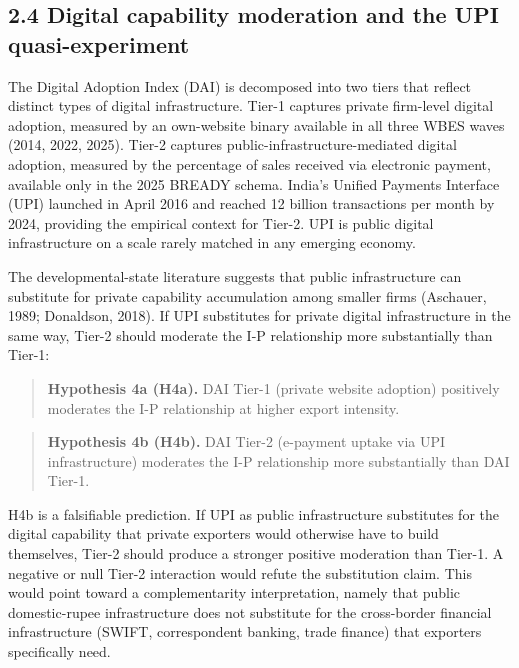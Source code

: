 \documentclass[
  12pt]{article}
\begin{document}
\hypertarget{digital-capability-moderation-and-the-upi-quasi-experiment}{%
\subsection{2.4 Digital capability moderation and the UPI
quasi-experiment}\label{digital-capability-moderation-and-the-upi-quasi-experiment}}

The Digital Adoption Index (DAI) is decomposed into two tiers that
reflect distinct types of digital infrastructure. Tier-1 captures
private firm-level digital adoption, measured by an own-website binary
available in all three WBES waves (2014, 2022, 2025). Tier-2 captures
public-infrastructure-mediated digital adoption, measured by the
percentage of sales received via electronic payment, available only in
the 2025 BREADY schema. India's Unified Payments Interface (UPI)
launched in April 2016 and reached 12 billion transactions per month by
2024, providing the empirical context for Tier-2. UPI is public digital
infrastructure on a scale rarely matched in any emerging economy.

The developmental-state literature suggests that public infrastructure
can substitute for private capability accumulation among smaller firms
(Aschauer, 1989; Donaldson, 2018). If UPI substitutes for private
digital infrastructure in the same way, Tier-2 should moderate the I-P
relationship more substantially than Tier-1:

\begin{quote}
\textbf{Hypothesis 4a (H4a).} DAI Tier-1 (private website adoption)
positively moderates the I-P relationship at higher export intensity.
\end{quote}

\begin{quote}
\textbf{Hypothesis 4b (H4b).} DAI Tier-2 (e-payment uptake via UPI
infrastructure) moderates the I-P relationship more substantially than
DAI Tier-1.
\end{quote}

H4b is a falsifiable prediction. If UPI as public infrastructure
substitutes for the digital capability that private exporters would
otherwise have to build themselves, Tier-2 should produce a stronger
positive moderation than Tier-1. A negative or null Tier-2 interaction
would refute the substitution claim. This would point toward a
complementarity interpretation, namely that public domestic-rupee
infrastructure does not substitute for the cross-border financial
infrastructure (SWIFT, correspondent banking, trade finance) that
exporters specifically need.
\end{document}
